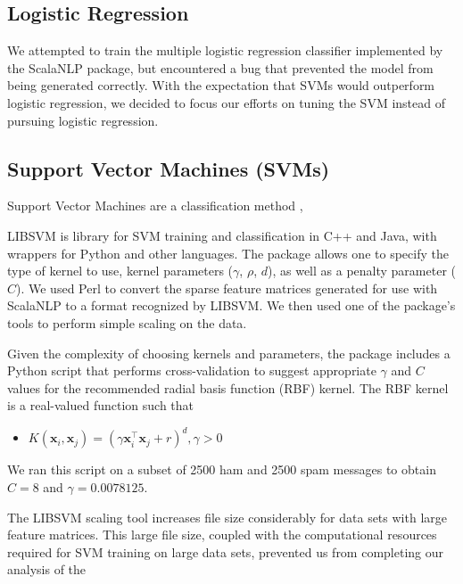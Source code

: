 \documentclass[preprint]{acm_proc_article-sp}
\begin{document}
\subsection{Logistic Regression}

We attempted to train the multiple logistic regression classifier implemented by the ScalaNLP package, but encountered a bug that prevented the model from being generated correctly. With the expectation that SVMs would outperform logistic regression, we decided to focus our efforts on tuning the SVM instead of pursuing logistic regression. 


\subsection{Support Vector Machines (SVMs)}


Support Vector Machines are a classification method  \cite{boser}, \cite{cortesv95} 



LIBSVM is library for SVM training and classification in C++ and Java, with wrappers for Python and other languages. The package allows one to specify the type of kernel to use, kernel parameters ($\gamma$, $\rho$, $d$), as well as a penalty parameter ($C$). We used Perl to convert the sparse feature matrices generated for use with ScalaNLP to a format recognized by LIBSVM. We then used one of the package's tools to perform simple scaling on the data. 

Given the complexity of choosing kernels and parameters, the package includes a Python script that performs cross-validation to suggest appropriate $\gamma$ and $C$ values for the recommended radial basis function (RBF) kernel. The RBF kernel is a real-valued function such that 

\begin{itemize}
\item $K(\mathbf{x}_i, \mathbf{x}_j) = (\gamma\mathbf{x}_i^\intercal\mathbf{x}_j+r)^d, \gamma>0$
\end{itemize}
We ran this script on a subset of 2500 ham and 2500 spam messages to obtain $C = 8$ and $\gamma = 0.0078125$.

The LIBSVM scaling tool increases file size considerably for data sets with large feature matrices. This large file size, coupled with the computational resources required for SVM training on large data sets, prevented us from completing our analysis of the 
\end{document}
